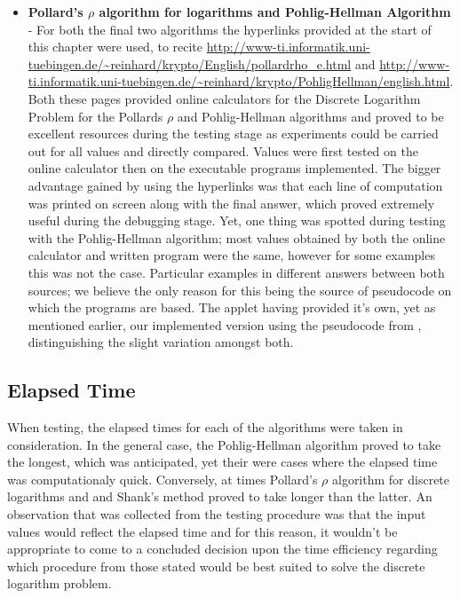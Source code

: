 \documentclass[iwp,first]{luthesis}
\begin{document}
\begin{itemize}
\item \textbf{Pollard's $\rho$ algorithm for logarithms and Pohlig-Hellman Algorithm} - For both the final two algorithms the hyperlinks provided at the start of this chapter were used, to recite \url{http://www-ti.informatik.uni-tuebingen.de/~reinhard/krypto/English/pollardrho_e.html} and \url{http://www-ti.informatik.uni-tuebingen.de/~reinhard/krypto/PohligHellman/english.html}. Both these pages provided  online calculators for the Discrete Logarithm Problem for the Pollards $\rho$ and Pohlig-Hellman algorithms and proved to be excellent resources during the testing stage as experiments could be carried out for all values and directly compared. Values were first tested on the online calculator then on the executable programs implemented. The bigger advantage gained by using the hyperlinks was that each line of computation was printed on screen along with the final answer, which proved extremely useful during the debugging stage. Yet, one thing was spotted during testing with the Pohlig-Hellman algorithm; most values obtained by both the online calculator and written program were the same, however for some examples this was not the case. Particular examples in different answers between both sources; we believe the only reason for this being the source of pseudocode on which the programs are based. The applet having provided it's own, yet as mentioned earlier, our implemented version using the pseudocode from \cite{HAC}, distinguishing the slight variation amongst both.

\end{itemize}




\subsection{Elapsed Time}

When testing, the elapsed times for each of the algorithms were taken in consideration. In the general case, the Pohlig-Hellman algorithm proved to take the longest, which was anticipated, yet their were cases where the elapsed time was computationaly quick. Conversely, at times Pollard's $\rho$ algorithm for discrete logarithms and and Shank's method proved to take longer than the latter. An observation that was collected from the testing procedure was that the input values would reflect the elapsed time and for this reason, it wouldn't be appropriate to come to a  concluded decision upon the time efficiency regarding which procedure from those stated would be best suited to solve the discrete logarithm problem.
\end{document}
